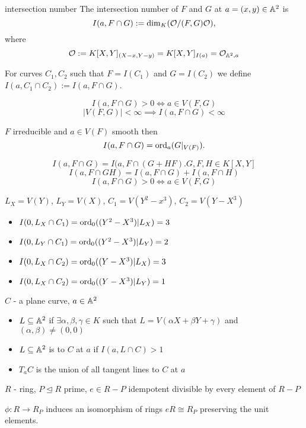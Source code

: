 \documentclass[twoside, a4paper, 12pt]{book}
\begin{document}
\begin{definition}{intersection number}{}
  The intersection number of $F$ and $G$ at $a=(x,y)\in \mathbb{A}^2$ is
  $$I(a, F\cap G):=\dim_K(\mathcal{O}/(F,G)\mathcal{O}),$$
  where 
  $$\mathcal{O}:=K[X,Y]_{(X-x, Y-y)}=K[X,Y]_{I(a)}=\mathcal{O}_{\mathbb{A}^2,a}$$

  For curves $C_1, C_2$ such that $F=I(C_1)$ and $G=I(C_2)$ we define $I(a, C_1\cap C_2):=I(a, F\cap G)$.
\end{definition}

$$I(a, F\cap G)>0\iff a\in V(F,G)$$
$$|V(F,G)|<\infty\implies I(a, F\cap G)<\infty$$
\begin{center}
  $F$ irreducible and $a\in V(F)$ smooth then 
  $$I(a, F\cap G)=\operatorname{ord}_a(G|_{V(F)}).$$
\end{center}

$$I(a, F\cap G)=I(a, F\cap (G+HF). G,F,H\in K[X,Y]$$
$$I(a, F\cap GH)=I(a, F\cap G)+I(a, F\cap H)$$
$$I(a, F\cap G)>0\iff a\in V(F, G)$$


$L_X=V(Y)$, $L_Y=V(X)$, $C_1=V(Y^2-x^3)$, $C_2=V(Y-X^3)$
\begin{itemize}
  \item $I(0, L_X\cap C_1)=\operatorname{ord}_0((Y^2-X^3)|L_X)=3$
  \item $I(0, L_Y\cap C_1)=\operatorname{ord}_0((Y^2-X^3)|L_Y)=2$
  \item $I(0, L_X\cap C_2)=\operatorname{ord}_0((Y-X^3)|L_X)=3$
  \item $I(0, L_X\cap C_2)=\operatorname{ord}_0((Y-X^3)|L_Y)=1$
\end{itemize}

\begin{definition}{}{}
  $C$ - a plane curve, $a\in\mathbb{A}^2$

  \begin{itemize}
    \item $L\subseteq \mathbb{A}^2$  if $\exists \alpha, \beta, \gamma\in K$ such that $L=V(\alpha X+\beta Y+\gamma)$ and $(\alpha, \beta)\neq(0,0)$
    \item $L\subseteq\mathbb{A}^2$ is  to $C$ at $a$ if $I(a, L\cap C)>1$
    \item $T_aC$ is the union of all tangent lines to $C$ at $a$
  \end{itemize}
\end{definition}

\begin{lemma}{}{}
  $R$ - ring, $P\trianglelefteq R$ prime, $e\in R-P$ idempotent divisible by every element of $R-P$

  $\phi: R\to R_P$ induces an isomorphism of rings $eR\cong R_P$ preserving the unit elements.
\end{lemma}
\end{document}
